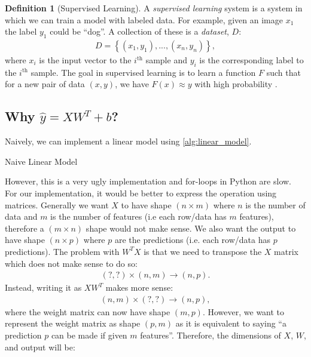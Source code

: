 \documentclass[11pt]{article}
\numberwithin{equation}{section}
\theoremstyle{definition}%
\newtheorem{definition}{Definition}[section]%
\newcommand{\pluseq}{\mathrel{+}=}
\begin{document}
\begin{definition}[Supervised Learning]
A \emph{supervised learning} system is a system in which we can train a model with labeled data. For example, given an image $x_{1}$ the label $y_{1}$ could be ``dog''. A collection of these is a \emph{dataset}, $D$:
\begin{align}
D= \left\{(x_1, y_1), ..., (x_n, y_n)\right\},
\end{align}
where $x_i$ is the input vector to the $i^{\text{th}}$ sample and $y_i$ is the corresponding label to the $i^{\text{th}}$ sample. The goal in supervised learning is to learn a function $F$ such that for a new pair of data $(x, y)$, we have $F(x) \approx y$ with high probability \cite{Cornell}.
\end{definition}

\subsection{Why $\hat{y} = XW^{T} + b$?}
\label{section:linearconvention}
Naively, we can implement a linear model using \autoref{alg:linear_model}. 
\begin{algorithm}
    \caption{Naive Linear Model}
    \begin{algorithmic}[1]
            \State{$y \pluseq w_j \ast x_j$} 
        \EndFor
    \end{algorithmic}
    \label{alg:linear_model}
\end{algorithm}
However, this is a very ugly implementation and for-loops in Python are slow. For our implementation, it would be better to express the operation using matrices. Generally we want $X$ to have shape $(n \times m)$ where $n$ is the number of data and $m$ is the number of features (i.e each row/data has $m$ features), therefore a $(m \times n)$ shape would not make sense. We also want the output to have shape $(n \times p)$ where $p$ are the predictions (i.e. each row/data has $p$ predictions). The problem with $W^TX$ is that we need to transpose the $X$ matrix which does not make sense to do so:
\begin{align}
    (?, ?) \times (n, m) \rightarrow (n, p).
\end{align}
Instead, writing it as $XW^T$ makes more sense:
\begin{align}
    (n,m) \times (?,?) \rightarrow (n,p),
\end{align}
where the weight matrix can now have shape $(m,p)$. However, we want to represent the weight matrix as shape $(p,m)$ as it is equivalent to saying ``a prediction $p$ can be made if given $m$ features''. Therefore, the dimensions of $X$, $W$, and output will be:
\end{document}
